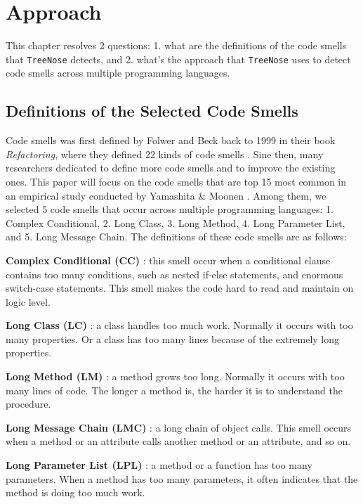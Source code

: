 \section{Approach}
\label{sec:approach}

This chapter resolves 2 questions: 1. what are the definitions of the code smells that \texttt{TreeNose} detects, 
and 2. what's the approach that \texttt{TreeNose} uses to detect code smells across multiple programming languages.


\subsection{Definitions of the Selected Code Smells}
\label{sec:Definitions of the Selected Code Smells}

Code smells was first defined by Folwer and Beck back to 1999 in their book \textit{Refactoring}, 
where they defined 22 kinds of code smells \cite{Fowler_Beck}. Sine then, many researchers dedicated to define more 
code smells and to improve the existing ones. This paper will focus on the code smells that are top 15 most common in 
an empirical study conducted by Yamashita \& Moonen \cite{developersCare}.
Among them, we selected 5 code smells that occur across multiple programming languages: 1. Complex Conditional, 2. Long Class,
3. Long Method, 4. Long Parameter List, and 5. Long Message Chain. The definitions of these code smells are as follows:

\textbf{Complex Conditional (CC)} \cite{Fowler_Beck}: this smell occur when a conditional clause contains too many conditions, 
such as nested if-else statements, and enormous switch-case statements. This smell makes the code hard to read and maintain on logic level.

\textbf{Long Class (LC)} \cite{Fowler_Beck}: a class handles too much work. Normally it occurs with too many properties. Or a class has too many lines because of 
the extremely long properties. 

\textbf{Long Method (LM)} \cite{Fowler_Beck}: a method grows too long. Normally it occurs with too many lines of code. The longer a method is, the harder it is to understand the procedure.

\textbf{Long Message Chain (LMC)} \cite{Fowler_Beck}: a long chain of object calls. This smell occurs when a method or an attribute calls another method or an attribute, and so on.

\textbf{Long Parameter List (LPL)} \cite{Fowler_Beck}: a method or a function has too many parameters. When a method has too many parameters, it often indicates that the method is doing too much work.

